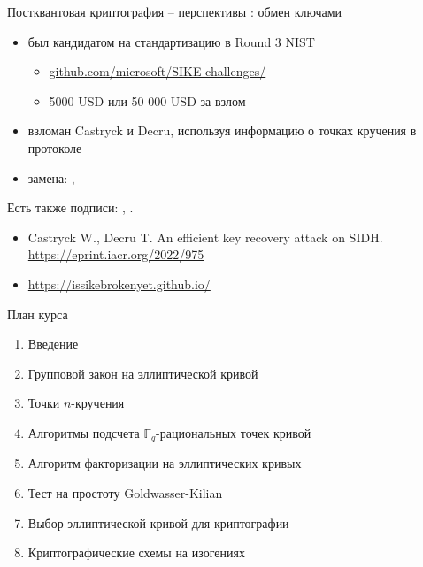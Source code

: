 \documentclass{beamer}
\begin{document}
\begin{frame}{Постквантовая криптография -- перспективы}
: обмен ключами
\begin{itemize}
    \item был кандидатом на стандартизацию в Round 3 NIST
    \begin{tcolorbox}[colframe=title-and-section-color!120, colback=title-and-section-color!5, title=SIKE Cryptographic Challenge, center title]
    	\begin{itemize}
    		\item {\small
    			\href{https://github.com/microsoft/SIKE-challenges/}{github.com/microsoft/SIKE-challenges/}}
    		\item 5000 USD или 50 000 USD за взлом
    	\end{itemize}
    \end{tcolorbox}
    \item взломан Castryck и Decru, используя информацию о точках кручения в протоколе
    \item замена: , 
\end{itemize}

\vspace{0.5em}
Есть также подписи: , .
\vspace{0.5em}
\begin{scriptsize}
	\begin{itemize}
		\item[\structure{*}] Castryck W., Decru T. An efficient key recovery attack on SIDH. \url{https://eprint.iacr.org/2022/975}
		\item[\structure{*}] \url{https://issikebrokenyet.github.io/}
	\end{itemize}
\end{scriptsize}
\end{frame}

\begin{frame}{План курса}
\begin{enumerate}
    \item Введение
    \item Групповой закон на эллиптической кривой
    \item Точки $n$-кручения
    \item Алгоритмы подсчета $\mathbb{F}_q$-рациональных точек кривой
    \item Алгоритм факторизации на эллиптических кривых
    \item Тест на простоту Goldwasser-Kilian
    \item Выбор эллиптической кривой для криптографии
    \item Криптографические схемы на изогениях
\end{enumerate}
\end{frame}
\end{document}
